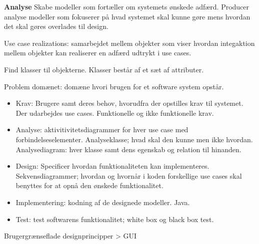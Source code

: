 \textbf{Analyse} Skabe modeller som fortæller om systemets ønskede adfærd. Producer analyse modeller som fokuserer på hvad systemet skal kunne gøre mens hvordan det skal gøres overlades til design. 

Use case realizations: samarbejdet mellem objekter som viser hvordan integaktion mellem objekter kan realiserer en adfærd udtrykt i use cases. 

Find klasser til objekterne. Klasser består af et sæt af attributer. 

Problem domænet: domæne hvori brugen for et software system opstår. 

\begin{itemize}
    \item Krav: Brugere samt deres behov, hvorudfra der opstilles krav til systemet. Der udarbejdes use cases. Funktionelle og ikke funktionelle krav. 
    \item Analyse: aktivitivitetsdiagrammer for hver use case med forbindelseselementer. Analyseklasse; hvad skal den kunne men ikke hvordan. Analysediagram: hver klasse samt dens egenskab og relation til hinanden. 
    \item Design: Specificer hvordan funktionaliteten kan implementeres. Sekvensdiagrammer; hvordan og hvornår i koden forskellige use cases skal benyttes for at opnå den ønskede funktionalitet. 
    \item Implementering: kodning af de designede modeller. Java. 
    \item Test: test softwarens funktionalitet; white box og black box test. 
\end{itemize}

Brugergrænseflade designprincipper > GUI